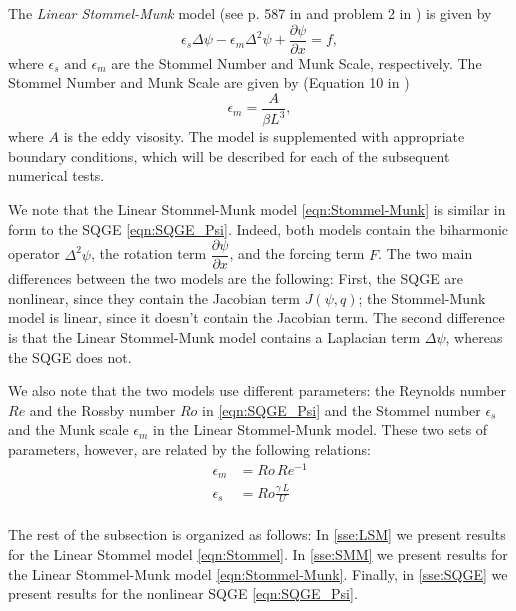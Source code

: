 The \emph{Linear Stommel-Munk} model (see p. 587 in \cite{Vallis06} and problem
2 in \cite{Cascon}) is given by
\begin{equation}
  \epsilon_s \Delta \psi - \epsilon_m \Delta^2 \psi + \frac{\partial \psi}{\partial x} = f,
  \label{eqn:Stommel-Munk}
\end{equation}
where $\epsilon_s \text{ and } \epsilon_m$ are the Stommel Number and Munk
Scale, respectively. The Stommel Number and Munk Scale are given by (Equation 10
in \cite{Myers})
\begin{equation*}
  \epsilon_m = \frac{A}{\beta L^3},
\end{equation*}
where $A$ is the eddy visosity.  The model is supplemented with appropriate
boundary conditions, which will be described for each of the subsequent
numerical tests.

We note that the Linear Stommel-Munk model \eqref{eqn:Stommel-Munk} is similar
in form to the SQGE \eqref{eqn:SQGE_Psi}. Indeed, both models contain the
biharmonic operator $\Delta^2 \psi$, the rotation term $\dfrac{\partial
\psi}{\partial x}$, and the forcing term $F$. The two main differences between
the two models are the following: First, the SQGE are nonlinear, since they
contain the Jacobian term $J(\psi,q)$; the Stommel-Munk model is linear, since
it doesn't contain the Jacobian term. The second difference is that the Linear
Stommel-Munk model contains a Laplacian term $\Delta \psi$, whereas the SQGE
does not.

We also note that the two models use different parameters: the Reynolds number
$Re$ and the Rossby number $Ro$ in \eqref{eqn:SQGE_Psi} and the Stommel number
$\epsilon_s$ and the Munk scale $\epsilon_m$ in the Linear Stommel-Munk model.
These two sets of parameters, however, are related by the following relations:
\begin{align}
  \epsilon_m &= Ro\, Re^{-1} \label{eqn:MunkScale}\\
  \epsilon_s &= Ro \frac{\gamma\, L}{U} \label{eqn:StommelNumber}\\
\end{align}

The rest of the subsection is organized as follows: In \autoref{sse:LSM} we
present results for the Linear Stommel model \eqref{eqn:Stommel}. In
\autoref{sse:SMM} we present results for the Linear Stommel-Munk model
\eqref{eqn:Stommel-Munk}. Finally, in \autoref{sse:SQGE} we present results for
the nonlinear SQGE \eqref{eqn:SQGE_Psi}.

